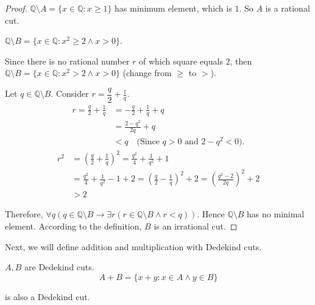 \begin{proof}
    \par $\mathbb{Q}\setminus A = \{ x\in\mathbb{Q}: x\ge 1 \}$ has minimum element, which is $1$. So $ A$ is a rational cut.
    \bigskip
    \par $\mathbb{Q}\setminus B = \{ x\in\mathbb{Q}: {x}^{2}\ge 2 \wedge x > 0 \}$.
    \par Since there is no rational number $r$ of which square equals $2$, then $\mathbb{Q}\setminus B = \{ x\in\mathbb{Q}: {x}^{2} > 2 \wedge x > 0 \}$ (change from $\ge$ to $>$).
    \par Let $q\in\mathbb{Q}\setminus B$. Consider $r = \dfrac{q}{2} + \frac{1}{q}$.
    \begin{align*}
        r = \frac{q}{2} + \frac{1}{q} & = -\frac{q}{2} + \frac{1}{q} + q                       \\
                                      & = \frac{2 - {q}^{2}}{2q} + q                           \\
                                      & < q \quad\text{(Since $q > 0$ and $2 - {q}^{2} < 0$)}.
    \end{align*}
    \begin{align*}
        {r}^{2} & = {\left(\frac{q}{2} + \frac{1}{q}\right)}^{2} = \frac{q^{2}}{4} + \frac{1}{q^{2}} + 1                                                         \\
                & = \frac{q^{2}}{4} + \frac{1}{q^{2}} - 1 + 2 = {\left(\frac{q}{2} - \frac{1}{q}\right)}^{2} + 2 = {\left( \frac{q^{2} - 2}{2q} \right)}^{2} + 2 \\
                & > 2
    \end{align*}
    \par Therefore, $\forall q(q\in\mathbb{Q}\setminus B \rightarrow \exists r( r\in\mathbb{Q}\setminus B \wedge r < q ))$. Hence $\mathbb{Q}\setminus B$ has no minimal element. According to the definition, $ B$ is an irrational cut.
\end{proof}

\par Next, we will define addition and multiplication with Dedekind cuts.

\begin{theorem}[Addition]
    \par $A, B$ are Dedekind cuts.
    \[
        A + B = \{ x + y : x\in A \wedge y\in B \}
    \]
    \par is also a Dedekind cut.
\end{theorem}

